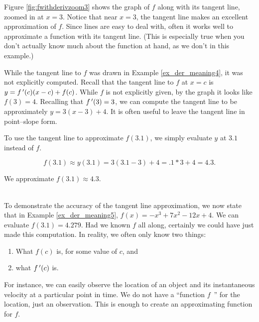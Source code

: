 {Figure \ref{fig:fwithderivzoom3} shows the graph of $f$ along with its tangent line, zoomed in at $x=3$. Notice that near $x=3$, the tangent line makes an excellent approximation of $f$. Since lines are easy to deal with, often it works well to approximate a function with its tangent line. (This is especially true when you don't actually know much about the function at hand, as we don't in this example.)


While the tangent line to $f$ was drawn in Example \ref{ex_der_meaning4}, it was not explicitly computed. Recall that the tangent line to $f$ at $x=c$ is $y = f\,'(c)(x-c)+f(c)$. While $f$ is not explicitly given, by the graph it looks like $f(3) = 4$. Recalling that $f\,'(3) = 3$, we can compute the tangent line to be approximately $y = 3(x-3)+4.$ It is often useful to leave the tangent line in point--slope form.

To use the tangent line to approximate $f(3.1)$, we simply evaluate $y$ at $3.1$ instead of $f$.

$$f(3.1) \approx y(3.1) = 3(3.1-3)+4 = .1*3+4 = 4.3.$$ 

We approximate $f(3.1) \approx 4.3.$
}\\

To demonstrate the accuracy of the tangent line approximation, we now state that in Example \ref{ex_der_meaning5}, $f(x) = -x^3+7x^2-12x+4$. We can evaluate $f(3.1) = 4.279$. Had we known $f$ all along, certainly we could have just made this computation. In reality, we often only know two things:
	\begin{enumerate}
	\item		What $f(c)$ is, for some value of $c$, and
	\item		what $f\,'(c)$ is.
	\end{enumerate}
	
For instance, we can easily observe the location of an object and its instantaneous velocity at a particular point in time. We do not have a ``function $f$\ '' for the location, just an observation. This is enough to create an approximating function for $f$.

